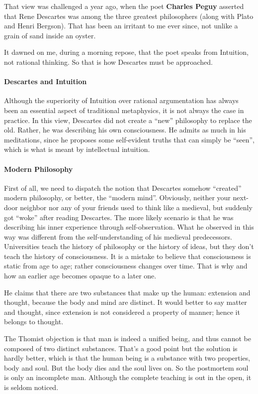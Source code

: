 That view was challenged a year ago, when the poet \textbf{Charles Peguy} asserted that Rene Descartes was among the three greatest philosophers (along with Plato and Henri Bergson). That has been an irritant to me ever since, not unlike a grain of sand inside an oyster.

It dawned on me, during a morning repose, that the poet speaks from Intuition, not rational thinking. So that is how Descartes must be approached.

\paragraph{Descartes and Intuition}


Although the superiority of Intuition over rational argumentation has always been an essential aspect of traditional metaphysics, it is not always the case in practice. In this view, Descartes did not create a ``new'' philosophy to replace the old. Rather, he was describing his own consciousness. He admits as much in his meditations, since he proposes some self-evident truths that can simply be ``seen'', which is what is meant by intellectual intuition.

\paragraph{Modern Philosophy}


First of all, we need to dispatch the notion that Descartes somehow ``created'' modern philosophy, or better, the ``modern mind''. Obviously, neither your next-door neighbor nor any of your friends used to think like a medieval, but suddenly got ``woke'' after reading Descartes. The more likely scenario is that he was describing his inner experience through self-observation. What he observed in this way was different from the self-understanding of his medieval predecessors. Universities teach the history of philosophy or the history of ideas, but they don't teach the history of consciousness. It is a mistake to believe that consciousness is static from age to age; rather consciousness changes over time. That is why and how an earlier age becomes opaque to a later one.

He claims that there are two substances that make up the human: extension and thought, because the body and mind are distinct. It would better to say matter and thought, since extension is not considered a property of manner; hence it belongs to thought.

The Thomist objection is that man is indeed a unified being, and thus cannot be composed of two distinct substances. That's a good point but the solution is hardly better, which is that the human being is a substance with two properties, body and soul. But the body dies and the soul lives on. So the postmortem soul is only an incomplete man. Although the complete teaching is out in the open, it is seldom noticed.

